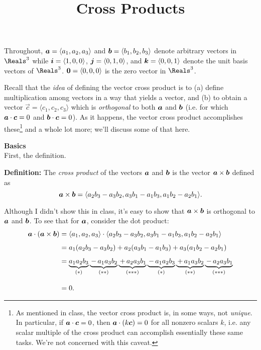 \documentclass[12pt]{article}
\title{\vspace{-0.75in}\LARGE{Cross Products}\vspace{-0.5in}}
\date{}
\newcommand{\sectitle}[1]{\vspace{7.5mm}\noindent\textbf{\Large{#1}}\\[3mm]}
\newcommand{\comps}[1]{\langle #1_1,#1_2,#1_3\rangle}
\newcommand{\compslong}[3]{\langle #1, #2, #3\rangle}
\begin{document}
	\maketitle
	
	\noindent Throughout, $\vect{a}=\comps{a}$ and $\vect{b}=\comps{b}$ denote arbitrary vectors in $\Reals^3$ while $\vect{i}=\compslong{1}{0}{0}$, $\vect{j}=\compslong{0}{1}{0}$, and $\vect{k}=\compslong{0}{0}{1}$ denote the unit basis vectors of $\Reals^3$. $\vect{0}=\compslong{0}{0}{0}$ is the zero vector in $\Reals^3$.
	
	Recall that the \textit{idea} of defining the vector cross product is to (a) define multiplication among vectors in a way that yields a vector, and (b) to obtain a vector $\vec{c}=\comps{c}$ which is \textit{orthogonal} to both $\boldsymbol{a}$ and $\boldsymbol{b}$ (i.e. for which $\boldsymbol{a}\cdot\boldsymbol{c}=0$ and $\boldsymbol{b}\cdot\boldsymbol{c}=0$). As it happens, the vector cross product accomplishes these\footnote{As mentioned in class, the vector cross product is, in some ways, not \textit{unique}. In particular, if $\boldsymbol{a}\cdot\boldsymbol{c}=0$, then $\boldsymbol{a}\cdot(k\boldsymbol{c})=0$ for all nonzero scalars $k$, i.e. any scalar multiple of the cross product can accomplish essentially these same tasks. We're not concerned with this caveat.} and a whole lot more; we'll discuss some of that here.

	\sectitle{Basics}
	\noindent First, the definition.\vspace{6mm}
	
	\noindent\textbf{Definition:} The \textit{cross product} of the vectors $\boldsymbol{a}$ and $\boldsymbol{b}$ is the vector $\boldsymbol{a}\times\boldsymbol{b}$ defined as
	\begin{equation}
		\label{eq:cross}
		\vect{a}\times\vect{b}=\compslong{a_2b_3-a_3b_2}{a_3b_1-a_1b_3}{a_1b_2-a_2b_1}.
	\end{equation}\vspace{3mm}
	
	Although I didn't show this in class, it's easy to show that $\boldsymbol{a}\times\boldsymbol{b}$ is orthogonal to $\boldsymbol{a}$ and $\boldsymbol{b}$. To see that for $\boldsymbol{a}$, consider the dot product:
	\begin{align}
		\vect{a}\cdot\left(\vect{a}\times\vect{b}\right) 
		&= \comps{a}\cdot \compslong{a_2b_3-a_3b_2}{a_3b_1-a_1b_3}{a_1b_2-a_2b_1}\nonumber \\[1.5mm]
		&\label{eq:dot1} = a_1(a_2b_3-a_3b_2) + a_2(a_3b_1-a_1b_3) + a_3(a_1b_2-a_2b_1)\\[1.5mm]
		& = \underbrace{a_1a_2b_3}_{(*)}\underbrace{\,-\,a_1a_3b_2}_{(**)}\underbrace{\,+\,a_2a_3b_1}_{(***)} \underbrace{\,-\,a_1a_2b_3}_{(*)}\underbrace{\,+\,a_1a_3b_2}_{(**)}\underbrace{\,-\,a_2a_3b_1}_{(***)}\nonumber\\[3mm]
		&\label{eq:dot2} = 0.
	\end{align}
	
\end{document}
